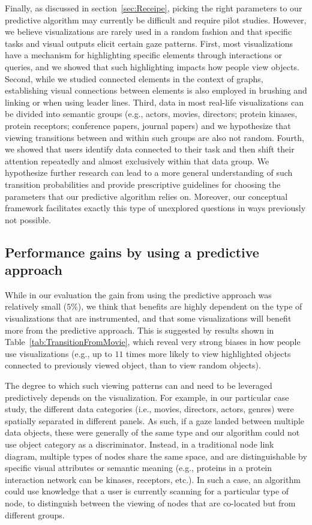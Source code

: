 Finally, as discussed in section~\ref{sec:Receipe}, picking the right parameters to our predictive algorithm may currently be difficult and require pilot studies.  However, we believe visualizations are rarely used in a random fashion and that specific tasks and visual outputs elicit certain gaze patterns. First, most visualizations have a mechanism for highlighting specific elements through interactions or queries, and we showed that such highlighting impacts how people view objects. Second, while we studied connected elements in the context of graphs, establishing visual connections between elements is also employed in brushing and linking or when using leader lines. Third, data in most real-life visualizations can be divided into semantic groups (e.g., actors, movies, directors; protein kinases, protein receptors; conference papers, journal papers) and we hypothesize that viewing transitions between and within such groups are also not random. Fourth, we showed that users identify data connected to their task and then shift their attention repeatedly and almost exclusively within that data group. We hypothesize further research can lead to a more general understanding of such transition probabilities and provide prescriptive guidelines for choosing the parameters that our predictive algorithm relies on.  Moreover, our conceptual framework facilitates exactly this type of unexplored questions in ways previously not possible. 

\subsection{Performance gains by using a predictive approach}
While in our evaluation the gain from using the predictive approach was relatively small ($5\%$), we think that benefits are highly dependent on the type of visualizations that are instrumented, and that some visualizations will benefit more from the predictive approach. This is suggested by results shown in Table~\ref{tab:TransitionFromMovie}, which reveal very strong biases in how people use visualizations (e.g., up to $11$ times more likely to view highlighted objects connected to previously viewed object, than to view random objects). 

The degree to which such viewing patterns can and need to be leveraged predictively depends on the visualization. For example, in our particular case study, the different data categories (i.e., movies, directors, actors, genres) were spatially separated in different panels. As such, if a gaze landed between multiple data objects, these were generally of the same type and our algorithm could not use object category as a discriminator. Instead, in a traditional node link diagram, multiple types of nodes share the same space, and are distinguishable by specific visual attributes or semantic meaning (e.g., proteins in a protein interaction network can be kinases, receptors, etc.). In such a case, an algorithm could use knowledge that a user is currently scanning for a particular type of node, to distinguish between the viewing of nodes that are co-located but from different groups.
 
